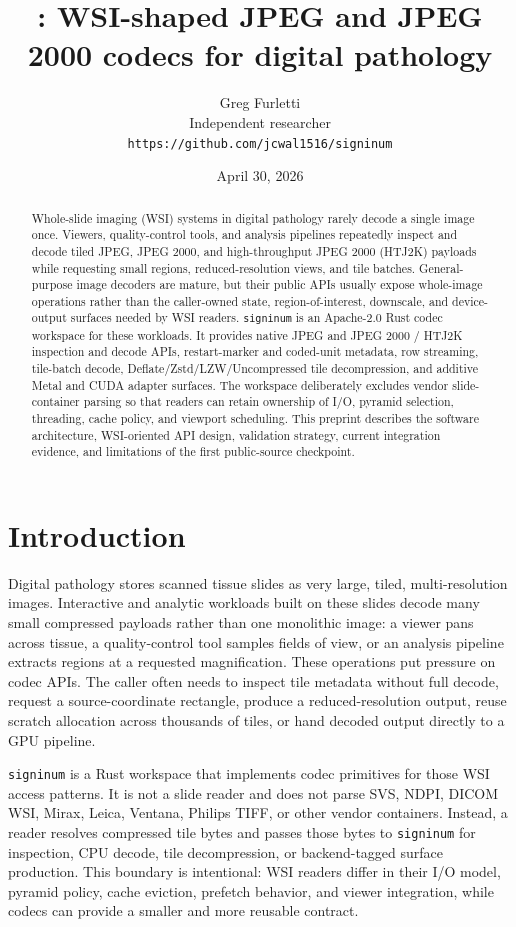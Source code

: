 \documentclass[11pt]{article}
\title{\signinum: WSI-shaped JPEG and JPEG 2000 codecs for digital pathology}
\author{
  Greg Furletti\\
  Independent researcher\\
  \texttt{https://github.com/jcwal1516/signinum}
}
\date{April 30, 2026}
\newcommand{\signinum}{\texttt{signinum}}
\begin{document}
\maketitle

\begin{abstract}
Whole-slide imaging (WSI) systems in digital pathology rarely decode a single
image once. Viewers, quality-control tools, and analysis pipelines repeatedly
inspect and decode tiled JPEG, JPEG 2000, and high-throughput JPEG 2000
(HTJ2K) payloads while requesting small regions, reduced-resolution views, and
tile batches. General-purpose image decoders are mature, but their public APIs
usually expose whole-image operations rather than the caller-owned state,
region-of-interest, downscale, and device-output surfaces needed by WSI
readers. \signinum{} is an Apache-2.0 Rust codec workspace for these workloads.
It provides native JPEG and JPEG 2000 / HTJ2K inspection and decode APIs,
restart-marker and coded-unit metadata, row streaming, tile-batch decode,
Deflate/Zstd/LZW/Uncompressed tile decompression, and additive Metal and CUDA
adapter surfaces. The workspace deliberately excludes vendor slide-container
parsing so that readers can retain ownership of I/O, pyramid selection,
threading, cache policy, and viewport scheduling. This preprint describes the
software architecture, WSI-oriented API design, validation strategy, current
integration evidence, and limitations of the first public-source checkpoint.
\end{abstract}

\section{Introduction}

Digital pathology stores scanned tissue slides as very large, tiled,
multi-resolution images. Interactive and analytic workloads built on these
slides decode many small compressed payloads rather than one monolithic image:
a viewer pans across tissue, a quality-control tool samples fields of view, or
an analysis pipeline extracts regions at a requested magnification. These
operations put pressure on codec APIs. The caller often needs to inspect tile
metadata without full decode, request a source-coordinate rectangle, produce a
reduced-resolution output, reuse scratch allocation across thousands of tiles,
or hand decoded output directly to a GPU pipeline.

\signinum{} is a Rust workspace that implements codec primitives for those WSI
access patterns. It is not a slide reader and does not parse SVS, NDPI, DICOM
WSI, Mirax, Leica, Ventana, Philips TIFF, or other vendor containers.
Instead, a reader resolves compressed tile bytes and passes those bytes to
\signinum{} for inspection, CPU decode, tile decompression, or backend-tagged
surface production. This boundary is intentional: WSI readers differ in their
I/O model, pyramid policy, cache eviction, prefetch behavior, and viewer
integration, while codecs can provide a smaller and more reusable contract.
\end{document}
